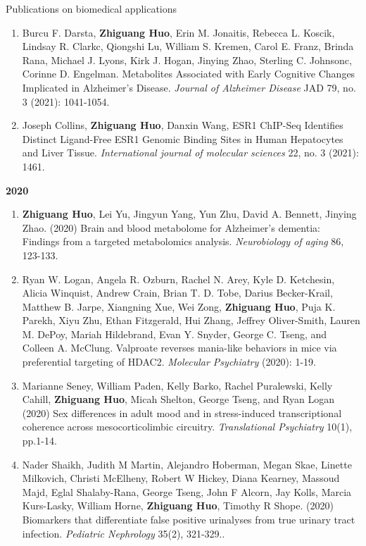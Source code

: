 \documentclass{resume} %
\begin{document}
\begin{rSection}{Publications on biomedical applications}
\begin{enumerate}[noitemsep,topsep=0pt, resume]
\item  
Burcu F. Darsta, {\bf Zhiguang Huo}, Erin M. Jonaitis, Rebecca L. Koscik, Lindsay R. Clarkc, Qiongshi Lu, William S. Kremen, Carol E. Franz, Brinda Rana, Michael J. Lyons, Kirk J. Hogan, Jinying Zhao, Sterling C. Johnsonc, Corinne D. Engelman.
Metabolites Associated with Early Cognitive Changes Implicated in Alzheimer's Disease.
\emph{Journal of Alzheimer Disease} JAD 79, no. 3 (2021): 1041-1054.


\item  Joseph Collins, {\bf Zhiguang Huo}, Danxin Wang, 
ESR1 ChIP-Seq Identifies Distinct Ligand-Free ESR1 Genomic Binding Sites in Human Hepatocytes and Liver Tissue.
\emph{International journal of molecular sciences} 22, no. 3 (2021): 1461.

\end{enumerate}


\textbf{2020}
\begin{enumerate}[noitemsep,topsep=0pt, resume]

\item  {\bf Zhiguang Huo}, Lei Yu, Jingyun Yang, Yun Zhu,  David A. Bennett, Jinying Zhao. (2020)
Brain and blood metabolome for Alzheimer's dementia: Findings from a targeted metabolomics analysis.
\emph{Neurobiology of aging}  86, 123-133.

\item
Ryan W. Logan, Angela R. Ozburn, Rachel N. Arey, Kyle D. Ketchesin, Alicia Winquist, Andrew Crain, Brian T. D. Tobe, Darius Becker-Krail, Matthew B. Jarpe, Xiangning Xue, Wei Zong, {\bf Zhiguang Huo}, Puja K. Parekh, Xiyu Zhu, Ethan Fitzgerald, Hui Zhang, Jeffrey Oliver-Smith, Lauren M. DePoy, Mariah Hildebrand, Evan Y. Snyder, George C. Tseng, and Colleen A. McClung. 
Valproate reverses mania-like behaviors in mice via preferential targeting of HDAC2.
\emph{Molecular Psychiatry} (2020): 1-19.

\item 
Marianne Seney, William Paden, Kelly Barko, Rachel Puralewski, Kelly Cahill, {\bf Zhiguang Huo}, Micah Shelton, George Tseng, and Ryan Logan
(2020)
Sex differences in adult mood and in stress-induced transcriptional coherence across mesocorticolimbic circuitry.
\emph{Translational Psychiatry}  10(1), pp.1-14.

\item
Nader Shaikh, Judith M Martin, Alejandro Hoberman, Megan Skae, Linette Milkovich, Christi McElheny, Robert W Hickey, Diana Kearney, Massoud Majd, Eglal Shalaby-Rana, George Tseng, John F Alcorn, Jay Kolls, Marcia Kurs-Lasky, William Horne, {\bf Zhiguang Huo}, Timothy R Shope.  (2020)
Biomarkers that differentiate false positive urinalyses from true urinary tract infection. 
\emph{Pediatric Nephrology}  35(2), 321-329..




\end{enumerate}
\end{rSection}
\end{document}
